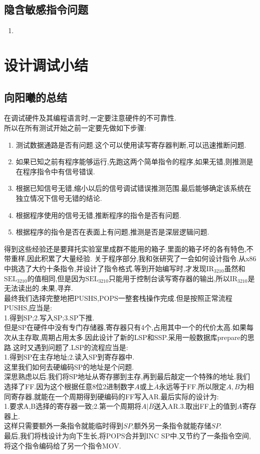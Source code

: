 \documentclass[UTF8]{ctexart}
\begin{document}
\subsection{隐含敏感指令问题}
\begin{enumerate}
	\item 
\end{enumerate}
\section{设计调试小结}
\subsection{向阳曦的总结}
在调试硬件及其编程语言时,一定要注意硬件的不可靠性.\\
\indent 所以在所有测试开始之前一定要先做如下步骤:
\begin{enumerate}
	\item 测试数据通路是否有问题.这个可以使用读写寄存器判断,可以迅速推断问题.
	\item 如果已知之前有程序能够运行,先跑这两个简单指令的程序,如果无错,则推测是在程序指令中有信号错误.
	\item 根据已知信号无错,缩小以后的信号调试错误推测范围.最后能够确定该系统在独立情况下信号无错的结论.
	\item 根据程序使用的信号无错,推断程序的指令是否有问题.
	\item 根据程序的指令是否在表面上有问题,推测是否是深层逻辑问题.
\end{enumerate}
\indent\indent 得到这些经验还是要拜托实验室里成群不能用的箱子.里面的箱子坏的各有特色,不带重样,因此积累了大量经验.
关于程序部分,我和张研究了一会如何设计指令.从x86中挑选了大约十条指令,并设计了指令格式.等到开始编写时,才发现$\text{IR}_{3210}$虽然和$\text{SEL}_{3210}$的值相同,但是因为$\text{SEL}_{3210}$只能用于控制台读写寄存器的输出,所以$\text{IR}_{3210}$是无法读出的.未果,寻弃.\\
\indent 最终我们选择完整地把PUSHS,POPS一整套栈操作完成.但是按照正常流程PUSHS,应当是:\\
\indent \indent 1.得到SP;2.写入SP;3.SP下推.
\\ 但是SP在硬件中没有专门存储器,寄存器只有4个,占用其中一个的代价太高.如果每次从主存取,周期占用太多.因此设计了新的LSP和SSP.采用一般数据库prepare的思路.这时又遇到问题了.LSP的流程应当是:\\
\indent \indent 1.得到SP在主存地址;2.读入SP到寄存器中.\\
\indent 这里我们如何去硬编码SP的地址是个问题.\\
\indent 深思熟虑以后.我们将SP地址从寄存挪到主存,再到最后敲定一个特殊的地址.我们选择了FF.因为这个根据任意8位2进制数字$A$或上$\overline{A}$永远等于FF.所以限定$A,B$为相同寄存器,就能在一个周期得到硬编码的FF写入AR.最后实际的设计为:\\
\indent \indent 1.要求A,B选择的寄存器一致;2.第一个周期将$A|\overline{B}$送入AR.3.取出FF上的值到$A$寄存器上.\\
\indent 这样只需要额外一条指令就能临时得到$SP$,额外另一条指令就能存储$SP$.\\
\indent 最后,我们将栈设计为向下生长,将POPS合并到INC SP中.又节约了一条指令空间,将这个指令编码给了另一个指令MOV.
\end{document}
